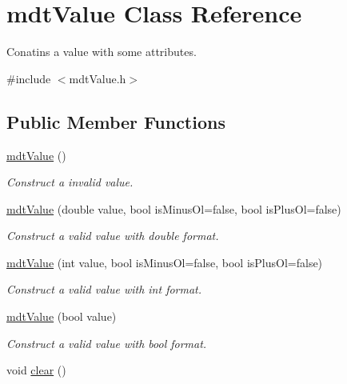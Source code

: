 \hypertarget{classmdt_value}{
\section{mdtValue Class Reference}
\label{classmdt_value}
}


Conatins a value with some attributes.  




{\ttfamily \#include $<$mdtValue.h$>$}

\subsection*{Public Member Functions}
\begin{DoxyCompactItemize}
\item 
\hypertarget{classmdt_value_a5eaad5ce886d11b6b3484525a8fa7f41}{
\hyperlink{classmdt_value_a5eaad5ce886d11b6b3484525a8fa7f41}{mdtValue} ()}
\label{classmdt_value_a5eaad5ce886d11b6b3484525a8fa7f41}

\begin{DoxyCompactList}\small\item\em Construct a invalid value. \end{DoxyCompactList}\item 
\hyperlink{classmdt_value_a3aafb3f186d3132a6bd3bf5f9238b04b}{mdtValue} (double value, bool isMinusOl=false, bool isPlusOl=false)
\begin{DoxyCompactList}\small\item\em Construct a valid value with double format. \end{DoxyCompactList}\item 
\hyperlink{classmdt_value_a023f1f91105ae7ea1040618c5a600b36}{mdtValue} (int value, bool isMinusOl=false, bool isPlusOl=false)
\begin{DoxyCompactList}\small\item\em Construct a valid value with int format. \end{DoxyCompactList}\item 
\hyperlink{classmdt_value_a0d6a8c5abbb4192f6dbcecc698c53b65}{mdtValue} (bool value)
\begin{DoxyCompactList}\small\item\em Construct a valid value with bool format. \end{DoxyCompactList}\item 
\hypertarget{classmdt_value_a8c4461857e4715e49b2050479d63bfb8}{
void \hyperlink{classmdt_value_a8c4461857e4715e49b2050479d63bfb8}{clear} ()}
\label{classmdt_value_a8c4461857e4715e49b2050479d63bfb8}


\end{DoxyCompactItemize}
